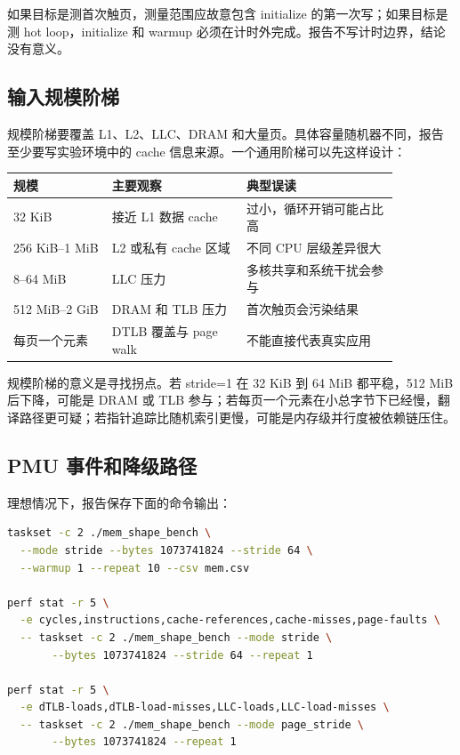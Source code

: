 如果目标是测首次触页，测量范围应故意包含 initialize 的第一次写；如果目标是测 hot loop，initialize 和 warmup 必须在计时外完成。报告不写计时边界，结论没有意义。

\subsection{输入规模阶梯}

规模阶梯要覆盖 L1、L2、LLC、DRAM 和大量页。具体容量随机器不同，报告至少要写实验环境中的 cache 信息来源。一个通用阶梯可以先这样设计：

\begin{center}
\small
\begin{tabular}{p{0.22\linewidth}p{0.30\linewidth}p{0.34\linewidth}}
\toprule
规模 & 主要观察 & 典型误读 \\
\midrule
32 KiB & 接近 L1 数据 cache & 过小，循环开销可能占比高 \\
256 KiB--1 MiB & L2 或私有 cache 区域 & 不同 CPU 层级差异很大 \\
8--64 MiB & LLC 压力 & 多核共享和系统干扰会参与 \\
512 MiB--2 GiB & DRAM 和 TLB 压力 & 首次触页会污染结果 \\
每页一个元素 & DTLB 覆盖与 page walk & 不能直接代表真实应用 \\
\bottomrule
\end{tabular}
\end{center}

规模阶梯的意义是寻找拐点。若 stride=1 在 32 KiB 到 64 MiB 都平稳，512 MiB 后下降，可能是 DRAM 或 TLB 参与；若每页一个元素在小总字节下已经慢，翻译路径更可疑；若指针追踪比随机索引更慢，可能是内存级并行度被依赖链压住。

\subsection{PMU 事件和降级路径}

理想情况下，报告保存下面的命令输出：

\begin{lstlisting}[language=bash,caption={cache/TLB 实验的 perf 命令形态}]
taskset -c 2 ./mem_shape_bench \
  --mode stride --bytes 1073741824 --stride 64 \
  --warmup 1 --repeat 10 --csv mem.csv

perf stat -r 5 \
  -e cycles,instructions,cache-references,cache-misses,page-faults \
  -- taskset -c 2 ./mem_shape_bench --mode stride \
       --bytes 1073741824 --stride 64 --repeat 1

perf stat -r 5 \
  -e dTLB-loads,dTLB-load-misses,LLC-loads,LLC-load-misses \
  -- taskset -c 2 ./mem_shape_bench --mode page_stride \
       --bytes 1073741824 --repeat 1
\end{lstlisting}

